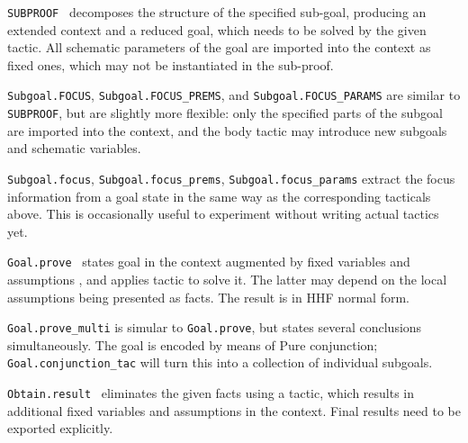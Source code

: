 \begin{isabellebody}
\begin{isamarkuptext}
  \begin{description}

  \item \verb|SUBPROOF|~ decomposes the structure
  of the specified sub-goal, producing an extended context and a
  reduced goal, which needs to be solved by the given tactic.  All
  schematic parameters of the goal are imported into the context as
  fixed ones, which may not be instantiated in the sub-proof.

  \item \verb|Subgoal.FOCUS|, \verb|Subgoal.FOCUS_PREMS|, and \verb|Subgoal.FOCUS_PARAMS| are similar to \verb|SUBPROOF|, but are
  slightly more flexible: only the specified parts of the subgoal are
  imported into the context, and the body tactic may introduce new
  subgoals and schematic variables.

  \item \verb|Subgoal.focus|, \verb|Subgoal.focus_prems|, \verb|Subgoal.focus_params| extract the focus information from a goal
  state in the same way as the corresponding tacticals above.  This is
  occasionally useful to experiment without writing actual tactics
  yet.

  \item \verb|Goal.prove|~ states goal  in the context augmented by fixed variables  and
  assumptions , and applies tactic  to solve
  it.  The latter may depend on the local assumptions being presented
  as facts.  The result is in HHF normal form.

  \item \verb|Goal.prove_multi| is simular to \verb|Goal.prove|, but
  states several conclusions simultaneously.  The goal is encoded by
  means of Pure conjunction; \verb|Goal.conjunction_tac| will turn this
  into a collection of individual subgoals.

  \item \verb|Obtain.result|~ eliminates the
  given facts using a tactic, which results in additional fixed
  variables and assumptions in the context.  Final results need to be
  exported explicitly.


\end{description}
\end{isamarkuptext}
\end{isabellebody}
